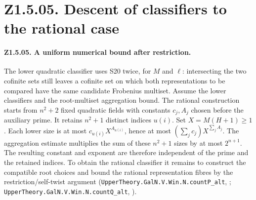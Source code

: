 \section*{Z1.5.05. Descent of classifiers to the rational case}

\paragraph{Z1.5.05. A uniform numerical bound after restriction.}
\label{r8:small:Z1.5.05}
The lower quadratic classifier uses S20 twice, for \(M\) and \(\ell\):
intersecting the two cofinite sets still leaves a cofinite set on which
both representations to be compared have the same candidate Frobenius
multiset. Assume the lower classifiers and the root-multiset aggregation
bound. The rational construction starts from \(n^2+2\) fixed quadratic
fields with constants \(c_j,A_j\) chosen before the auxiliary prime.
It retains \(n^2+1\) distinct indices \(u(i)\). Set \(X=M(H+1)\ge1\).
Each lower size is at most \(c_{u(i)}X^{A_{u(i)}}\), hence at most
\((\sum_j c_j)X^{\sum_j A_j}\). The aggregation estimate multiplies the
sum of these \(n^2+1\) sizes by at most \(2^{n+1}\).
The resulting constant and exponent are therefore independent of the
prime and the retained indices. To obtain the rational classifier it
remains to construct the compatible root choices and bound the rational
representation fibres by the restriction/self-twist argument
(\nolinkurl{UpperTheory.GalN.V.Win.N.countP_alt},
;
\nolinkurl{UpperTheory.GalN.V.Win.N.countQ_alt},
).

